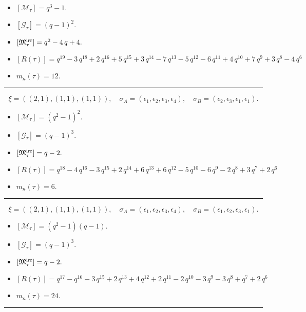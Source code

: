 \documentclass[10pt,a4paper]{amsart}
\begin{document}
\begin{itemize}
 \item $[\mathcal{M}_{\tau}] = q^{3} - 1 .$

 \item $[\mathcal{G}_{\tau}] = {\left(q - 1\right)}^{2} .$

 \item $[{\frak M}_{\tau}^{\textrm{irr}}] = q^{2} - 4 \, q + 4 .$

 \item $[R(\tau)] = q^{19} - 3 \, q^{18} + 2 \, q^{16} + 5 \, q^{15} + 3 \, q^{14} - 7 \, q^{13} - 5 \, q^{12} - 6 \, q^{11} + 4 \, q^{10} + 7 \, q^{9} + 3 \, q^{8} - 4 \, q^{6} $

 \item $m_{\kappa}(\tau) = 12 .$

 \end{itemize}
\noindent\rule{8cm}{0.4pt}

$$\xi = ({(2, 1)}, {(1, 1), (1, 1)}),\quad \sigma_A = ({{\epsilon_1, \epsilon_2}}, {{\epsilon_3}, {\epsilon_4}}),\quad \sigma_B = ({{\epsilon_2, \epsilon_3}}, {{\epsilon_1}, {\epsilon_1}}).$$

\begin{itemize}
 \item $[\mathcal{M}_{\tau}] = {\left(q^{2} - 1\right)}^{2} .$

 \item $[\mathcal{G}_{\tau}] = {\left(q - 1\right)}^{3} .$

 \item $[{\frak M}_{\tau}^{\textrm{irr}}] = q - 2 .$

 \item $[R(\tau)] = q^{18} - 4 \, q^{16} - 3 \, q^{15} + 2 \, q^{14} + 6 \, q^{13} + 6 \, q^{12} - 5 \, q^{10} - 6 \, q^{9} - 2 \, q^{8} + 3 \, q^{7} + 2 \, q^{6} $

 \item $m_{\kappa}(\tau) = 6 .$

 \end{itemize}
\noindent\rule{8cm}{0.4pt}

$$\xi = ({(2, 1)}, {(1, 1), (1, 1)}),\quad \sigma_A = ({{\epsilon_1, \epsilon_2}}, {{\epsilon_3}, {\epsilon_4}}),\quad \sigma_B = ({{\epsilon_1, \epsilon_2}}, {{\epsilon_3}, {\epsilon_1}}).$$

\begin{itemize}
 \item $[\mathcal{M}_{\tau}] = {\left(q^{2} - 1\right)} {\left(q - 1\right)} .$

 \item $[\mathcal{G}_{\tau}] = {\left(q - 1\right)}^{3} .$

 \item $[{\frak M}_{\tau}^{\textrm{irr}}] = q - 2 .$

 \item $[R(\tau)] = q^{17} - q^{16} - 3 \, q^{15} + 2 \, q^{13} + 4 \, q^{12} + 2 \, q^{11} - 2 \, q^{10} - 3 \, q^{9} - 3 \, q^{8} + q^{7} + 2 \, q^{6} $

 \item $m_{\kappa}(\tau) = 24 .$

 \end{itemize}
\noindent\rule{8cm}{0.4pt}
\end{document}
